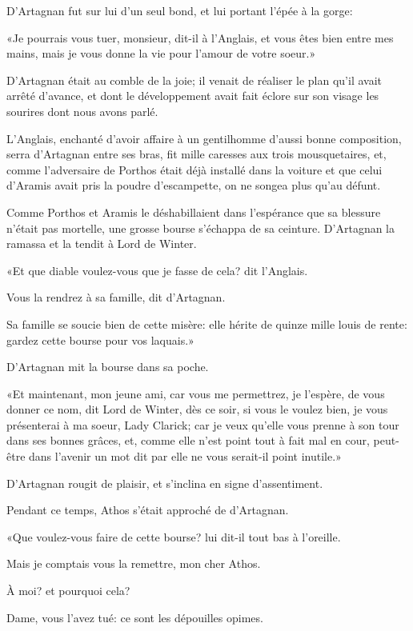 D'Artagnan fut sur lui d'un seul bond, et lui portant l'épée à la gorge: 

«Je pourrais vous tuer, monsieur, dit-il à l'Anglais, et vous êtes bien entre mes mains, mais je vous donne la vie pour l'amour de votre soeur.» 

D'Artagnan était au comble de la joie; il venait de réaliser le plan qu'il avait arrêté d'avance, et dont le développement avait fait éclore sur son visage les sourires dont nous avons parlé. 

L'Anglais, enchanté d'avoir affaire à un gentilhomme d'aussi bonne composition, serra d'Artagnan entre ses bras, fit mille caresses aux trois mousquetaires, et, comme l'adversaire de Porthos était déjà installé dans la voiture et que celui d'Aramis avait pris la poudre d'escampette, on ne songea plus qu'au défunt. 

Comme Porthos et Aramis le déshabillaient dans l'espérance que sa blessure n'était pas mortelle, une grosse bourse s'échappa de sa ceinture. D'Artagnan la ramassa et la tendit à Lord de Winter. 

«Et que diable voulez-vous que je fasse de cela? dit l'Anglais. 

\speak  Vous la rendrez à sa famille, dit d'Artagnan. 

\speak  Sa famille se soucie bien de cette misère: elle hérite de quinze mille louis de rente: gardez cette bourse pour vos laquais.» 

D'Artagnan mit la bourse dans sa poche. 

«Et maintenant, mon jeune ami, car vous me permettrez, je l'espère, de vous donner ce nom, dit Lord de Winter, dès ce soir, si vous le voulez bien, je vous présenterai à ma soeur, Lady Clarick; car je veux qu'elle vous prenne à son tour dans ses bonnes grâces, et, comme elle n'est point tout à fait mal en cour, peut-être dans l'avenir un mot dit par elle ne vous serait-il point inutile.» 

D'Artagnan rougit de plaisir, et s'inclina en signe d'assentiment. 

Pendant ce temps, Athos s'était approché de d'Artagnan. 

«Que voulez-vous faire de cette bourse? lui dit-il tout bas à l'oreille. 

\speak  Mais je comptais vous la remettre, mon cher Athos. 

\speak  À moi? et pourquoi cela? 

\speak  Dame, vous l'avez tué: ce sont les dépouilles opimes. 

